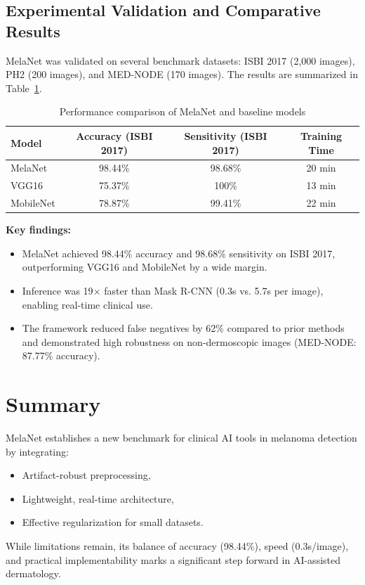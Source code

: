 \documentclass[a4paper,12pt]{report}
\begin{document}
\begin{spacing}{1.5}
    \subsection*{Experimental Validation and Comparative Results}
    
    MelaNet was validated on several benchmark datasets: ISBI 2017 (2,000 images), PH2 (200 images), and MED-NODE (170 images). The results are summarized in Table~\ref{tab:melanet_performance}.
    
    \begin{table}[H]
    \centering
    \caption{Performance comparison of MelaNet and baseline models}
    \label{tab:melanet_performance}
    \begin{tabular}{|l|c|c|c|}
    \hline
    \textbf{Model} & \textbf{Accuracy (ISBI 2017)} & \textbf{Sensitivity (ISBI 2017)} & \textbf{Training Time} \\
    \hline
    MelaNet & 98.44\% & 98.68\% & 20 min \\
    VGG16   & 75.37\% & 100\%   & 13 min \\
    MobileNet & 78.87\% & 99.41\% & 22 min \\
    \hline
    \end{tabular}
    \end{table}
    
    \textbf{Key findings:}
    \begin{itemize}
        \item MelaNet achieved 98.44\% accuracy and 98.68\% sensitivity on ISBI 2017, outperforming VGG16 and MobileNet by a wide margin.
        \item Inference was 19$\times$ faster than Mask R-CNN (0.3s vs. 5.7s per image), enabling real-time clinical use.
        \item The framework reduced false negatives by 62\% compared to prior methods and demonstrated high robustness on non-dermoscopic images (MED-NODE: 87.77\% accuracy).
    \end{itemize}

    \newpage    
    \section{Summary}
    
    MelaNet establishes a new benchmark for clinical AI tools in melanoma detection by integrating:
    \begin{itemize}
        \item Artifact-robust preprocessing,
        \item Lightweight, real-time architecture,
        \item Effective regularization for small datasets.
    \end{itemize}
    While limitations remain, its balance of accuracy (98.44\%), speed (0.3s/image), and practical implementability marks a significant step forward in AI-assisted dermatology.


\end{spacing}
\end{document}
